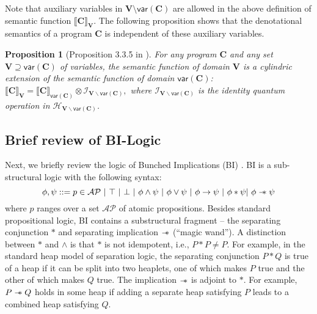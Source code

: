 \documentclass[conference,compsoc, 10pt]{IEEEtran}
\newtheorem{proposition}{Proposition}[section]
\newcommand {\cH } {{\mathcal{H}}}
\newcommand {\cI } {{\mathcal{I}}}
\newcommand {\vars } {\mathbf{V}}
\newcommand {\var } {\mathsf{var}}
\newcommand {\prog } {{\mathbf{C}}}
\newcommand {\sepimp} {\mathrel{-\mkern-6mu*}}
\newcommand {\sem}[1] {\llbracket#1\rrbracket}
\newcommand {\AP} {{\mathcal{AP}}}
\begin{document}
	Note that auxiliary variables in $\vars\setminus\var(\prog)$ are allowed in the above definition of semantic function $\sem{\prog}_{\vars}$. The following proposition shows that the denotational semantics of a program $\prog$ is independent of these auxiliary variables.   
  \begin{proposition}[Proposition 3.3.5 in \cite{Ying16}]
		\label{prop sem qo} For any program $\prog$ and any set $\vars\supseteq\var(\prog)$ of variables, the semantic function of domain $\vars$ is a cylindric extension of the  semantic function of domain $\var(\prog)$:
		$\sem{\prog}_{\vars} = \sem{\prog}_{\var(\prog)}\otimes\cI_{\vars\backslash\var(\prog)},$
		where $\cI_{\vars\backslash\var(\prog)}$ is the identity quantum operation in $\cH_{\vars\backslash\var(\prog)}$.
	\end{proposition}
	
	
	
	\subsection{Brief review of BI-Logic}
	\label{sec brief review of BI}
  Next, we briefly review the logic of Bunched Implications (BI)
  \cite{OP99,Pym02}. BI is a sub-structural logic with the following syntax:
	$$
	\phi,\psi ::= p\in\AP\ |\ \top\ |\ \bot\ |\ \phi\wedge\psi\ |\ \phi\vee\psi\ |\ \phi\rightarrow\psi\ |\ \phi\ast\psi
	|\ \phi\sepimp\psi
	$$
  where $p$ ranges over a set $\AP$ of atomic propositions. Besides standard
  propositional logic, BI contains a substructural fragment -- the separating
  conjunction $\ast$ and separating implication $\sepimp$ (``magic wand''). A
  distinction between $\ast$ and $\wedge$ is that $\ast$ is not idempotent,
  i.e., $P\ast P \neq P$. For example, in the standard heap model of separation
  logic, the separating conjunction $P\ast Q$ is true of a heap if it can be
  split into two heaplets, one of which makes $P$ true and the other of which
  makes $Q$ true. The implication $\sepimp$ is adjoint to $*$. For example, $P
  \sepimp Q$ holds in some heap if adding a separate heap satisfying $P$ leads
  to a combined heap satisfying $Q$.
	
\end{document}
